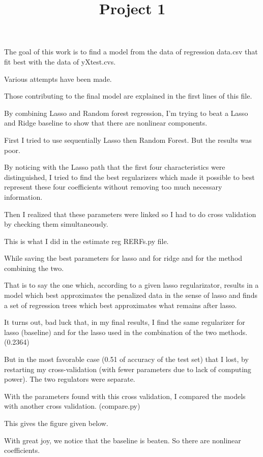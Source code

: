 \documentclass{article}
\date{}
\date{}
\title{Project 1 }
\begin{document}
\maketitle

The goal of this work is to find a model from the data of regression data.csv that fit best with the data of yXtest.cvs.

Various attempts have been made.

Those contributing to the final model are explained in the first lines of this file.

By combining Lasso and Random forest regression, I'm trying to beat a Lasso and Ridge baseline to show that there are nonlinear components.

First I tried to use sequentially Lasso then Random Forest. But the results was poor.

By noticing with the Lasso path that the first four characteristics were distinguished, I tried to find the best regularizers which made it possible to best represent these four coefficients without removing too much necessary information.

Then I realized that these parameters were linked so I had to do cross validation by checking them simultaneously.

This is what I did in the estimate reg RERFs.py file. 

While saving the best parameters for lasso and for ridge and for the method combining the two.

That is to say the one which, according to a given lasso regularizator, results in a model which best approximates the penalized data in the sense of lasso and finds a set of regression trees which best approximates what remains after lasso.

It turns out, bad luck that, in my final results, I find the same regularizer for lasso (baseline) and for the lasso used in the combination of the two methods. (0.2364)

But in the most favorable case (0.51 of accuracy of the test set) that I lost, by restarting my cross-validation (with fewer parameters due to lack of computing power).
The two regulators were separate. 



With the parameters found with this cross validation, I compared the models with another cross validation. (compare.py)

This gives the figure given below.

With great joy, we notice that the baseline is beaten.
So there are nonlinear coefficients.
\end{document}
